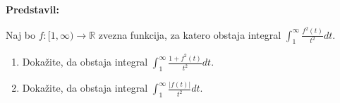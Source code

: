 \textbf{Predstavil:}

Naj bo $f: [1, \infty) \to \mathbb{R}$ zvezna funkcija, za katero obstaja integral $ \displaystyle \int_{1}^{\infty} \frac{f^{2}(t)}{t^{2}} dt$.
\begin{enumerate}
  \item Dokažite, da obstaja integral $ \displaystyle \int_{1}^{\infty} \frac{1+ f^{2}(t)}{t^{2}} dt$.
  \item Dokažite, da obstaja integral $ \displaystyle \int_{1}^{\infty} \frac{|f(t)|}{t^{2}} dt$.
\end{enumerate}